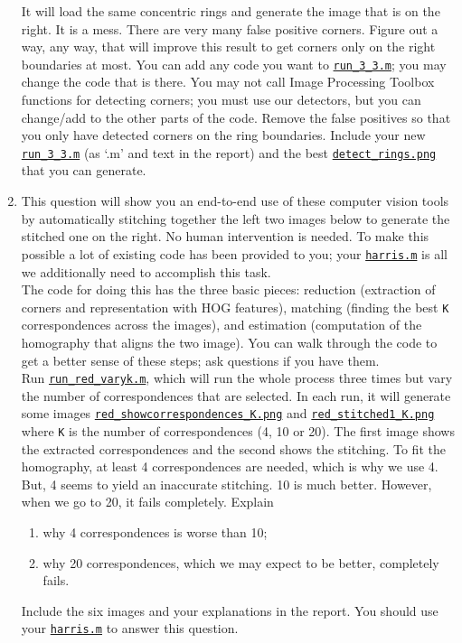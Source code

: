 \begin{enumerate}
		It will load the same concentric rings and generate the image that is on the right.
		It is a mess. There are very many false positive corners.
		Figure out a way, any way, that will improve this result to get corners only on the right boundaries at most.
		You can add any code you want to \href{./hw2/problem3/run_3_3.m}{\texttt{run\_3\_3.m}};
		you may change the code that is there.
		You may not call Image Processing Toolbox functions for detecting corners;
		you must use our detectors, but you can change/add to the other parts of the code.
		Remove the false positives so that you only have detected corners on the ring boundaries.
		Include your new \href{./hw2/problem3/run_3_3.m}{\texttt{run\_3\_3.m}} (as `.m' and text in the report) and the best \href{./hw2/problem3/detect_rings.png}{\texttt{detect\_rings.png}} that you can generate.
\item This question will show you an end-to-end use of these computer vision tools by automatically stitching together the left two images below to generate the stitched one on the right.
		No human intervention is needed.
		To make this possible a lot of existing code has been provided to you; your \href{./hw2/problem3/harris.m}{\texttt{harris.m}} is all we additionally need to accomplish this task.\\
		The code for doing this has the three basic pieces: reduction (extraction of corners and representation with HOG features), matching (finding the best \texttt{K} correspondences across the images), and estimation (computation of the homography that aligns the two image).
		You can walk through the code to get a better sense of these steps; ask questions if you have them.\\
		Run \href{./hw2/problem3/run_red_varyk.m}{\texttt{run\_red\_varyk.m}}, which will run the whole process three times but vary the number of correspondences that are selected.
		In each run, it will generate some images \href{./hw2/problem3/red_showcorrespondences_K.png}{\texttt{red\_showcorrespondences\_K.png}} and \href{./hw2/problem3/red_stitched1_K.png}{\texttt{red\_stitched1\_K.png}} where \texttt{K} is the number of correspondences (4, 10 or 20).
		The first image shows the extracted correspondences and the second shows the stitching.
		To fit the homography, at least 4 correspondences are needed, which is why we use 4.
		But, 4 seems to yield an inaccurate stitching.
		10 is much better.
		However, when we go to 20, it fails completely.
		Explain
		\begin{enumerate}[(1)]
		\item why 4 correspondences is worse than 10;
		\item why 20 correspondences, which we may expect to be better, completely fails.
		\end{enumerate} 
		Include the six images and your explanations in the report.
		You should use your \href{./hw2/problem3/harris.m}{\texttt{harris.m}} to answer this question.
\end{enumerate}

